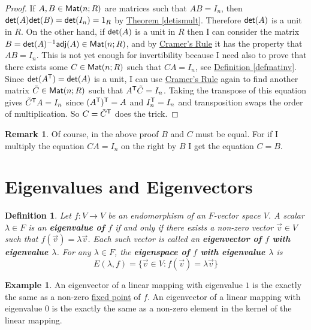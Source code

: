 \documentclass[11pt]{amsbook}
\newtheorem{definition}[theorem]{Definition}
\theoremstyle{definition}
\newtheorem{rem}[theorem]{Remark}
\newtheorem{ex}[theorem]{Example}
\begin{document}
\begin{proof}
If $A,B\in {\sf Mat}(n;R)$ are matrices such that $AB = I_n$, then ${\sf det}(A) {\sf det}(B) = {\sf det}(I_n) = 1_R$ by \hyperref[detismult]{Theorem \ref{detismult}}. Therefore ${\sf det}(A)$ is a unit in $R$. On the other hand, if ${\sf det}(A)$ is a unit in $R$ then I can consider the matrix $B = {\sf det}(A)^{-1} {\sf adj}(A) \in {\sf Mat}(n; R)$, and by \hyperref[Cramer]{Cramer's Rule} it has the property that $AB = I_n$. This is not yet enough for invertibility because I need also to prove that there exists some $C\in {\sf Mat}(n;R)$ such that $CA = I_n$, see \hyperref[defmatinv]{Definition \ref{defmatinv}}. Since ${\sf det}(A^{\sf T}) = {\sf det}(A)$ is  a unit, I can use \hyperref[Cramer]{Cramer's Rule} again to find another matrix $\tilde{C}\in {\sf Mat}(n;R)$ such that $A^{\sf T}\tilde{C} = I_n$. Taking the transpose of this equation gives  $\tilde{C}^{\sf T}A = I_n$ since $(A^{\sf T})^{\sf T} = A$ and $I_n^{\sf T} = I_n$ and transposition swaps the order of multiplication. So $C = \tilde{C}^{\sf T}$ does the trick.
\end{proof}

\begin{rem} Of course, in the above proof $B$ and $C$ must be equal. For if I multiply the equation $CA = I_n$ on the right by $B$ I get the equation $C = B$.
\end{rem}

\section{Eigenvalues and Eigenvectors}
\begin{definition}
Let $f: V\to V$ be an endomorphism of an $F$-vector space $V$. A scalar $\lambda \in F$ is an {\bf eigenvalue of $f$} if and only if there exists a non-zero vector $\vec{v} \in V$ such that $f(\vec{v})  = \lambda \vec{v}$. Each such vector is called an {\bf eigenvector of $f$ with eigenvalue $\lambda$}. For any $\lambda \in F$, the {\bf eigenspace of $f$ with eigenvalue $\lambda$} is $$E(\lambda, f) = \{ \vec{v}\in V: f(\vec{v}) = \lambda \vec{v} \}$$
\end{definition}

\begin{ex} An eigenvector of a linear mapping with eigenvalue $1$ is the exactly the same as a non-zero \hyperref[fixer]{fixed point} of $f$. An eigenvector of a linear mapping with eigenvalue $0$ is the exactly the same as a non-zero element in the kernel of the linear mapping.
\end{ex}
\end{document}
